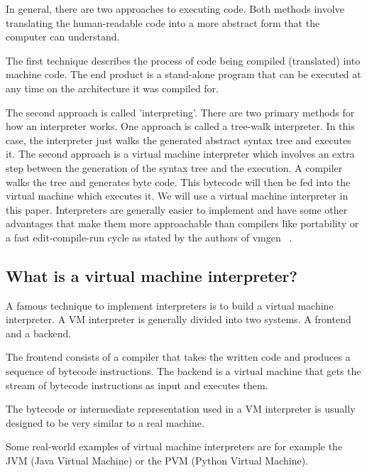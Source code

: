 \documentclass{article}
\begin{document}
In general, there are two approaches to executing code. Both methods involve
translating the human-readable code into a more abstract form that the computer
can understand.

The first technique describes the process of code being compiled (translated)
into machine code. The end product is a stand-alone program that can be
executed at any time on the architecture it was compiled for.

The second approach is called 'interpreting'. There are two primary methods for
how an interpreter works. One approach is called a tree-walk interpreter. In
this case, the interpreter just walks the generated abstract syntax tree and
executes it. The second approach is a virtual machine interpreter which
involves an extra step between the generation of the syntax tree and the
execution. A compiler walks the tree and generates byte code. This bytecode
will then be fed into the virtual machine which executes it. We will use a
virtual machine interpreter in this paper. Interpreters are generally easier to
implement and have some other advantages that make them more approachable than
compilers like portability or a fast edit-compile-run cycle as stated by the
authors of vmgen ~\cite{vmgen}. 


\subsection{What is a virtual machine interpreter?}
A famous technique to implement interpreters is to build a virtual machine
interpreter. A VM interpreter is generally divided into two systems. A frontend
and a backend. ~\cite{vmgen}

The frontend consists of a compiler that takes the written code and produces a
sequence of bytecode instructions. The backend is a virtual machine that gets
the stream of bytecode instructions as input and executes them. ~\cite{vmgen}

The bytecode or intermediate representation used in a VM interpreter is usually
designed to be very similar to a real machine. ~\cite{vmgen}

Some real-world examples of virtual machine interpreters are for example the
JVM (Java Virtual Machine) or the PVM (Python Virtual Machine).
\end{document}
